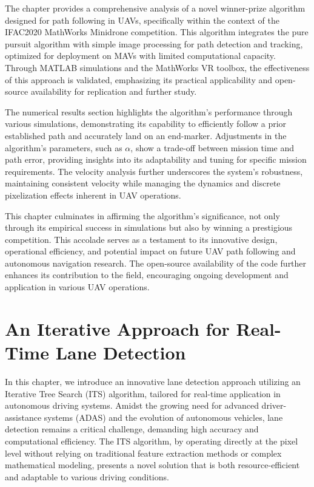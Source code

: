 The chapter provides a comprehensive analysis of a novel winner-prize algorithm designed for path following in UAVs, specifically within the context of the IFAC2020 MathWorks Minidrone competition. This algorithm integrates the pure pursuit algorithm with simple image processing for path detection and tracking, optimized for deployment on MAVs with limited computational capacity. Through MATLAB simulations and the MathWorks VR toolbox, the effectiveness of this approach is validated, emphasizing its practical applicability and open-source availability for replication and further study.

The numerical results section highlights the algorithm's performance through various simulations, demonstrating its capability to efficiently follow a prior established path and accurately land on an end-marker. Adjustments in the algorithm's parameters, such as $\alpha$, show a trade-off between mission time and path error, providing insights into its adaptability and tuning for specific mission requirements. The velocity analysis further underscores the system's robustness, maintaining consistent velocity while managing the dynamics and discrete pixelization effects inherent in UAV operations.

This chapter culminates in affirming the algorithm's significance, not only through its empirical success in simulations but also by winning a prestigious competition. This accolade serves as a testament to its innovative design, operational efficiency, and potential impact on future UAV path following and autonomous navigation research. The open-source availability of the code further enhances its contribution to the field, encouraging ongoing development and application in various UAV operations.




\chapter{An Iterative Approach for Real-Time Lane Detection}
\label{Chapter:2}


In this chapter, we introduce an innovative lane detection approach utilizing an Iterative Tree Search (ITS) algorithm, tailored for real-time application in autonomous driving systems. Amidst the growing need for advanced driver-assistance systems (ADAS) and the evolution of autonomous vehicles, lane detection remains a critical challenge, demanding high accuracy and computational efficiency. The ITS algorithm, by operating directly at the pixel level without relying on traditional feature extraction methods or complex mathematical modeling, presents a novel solution that is both resource-efficient and adaptable to various driving conditions.


